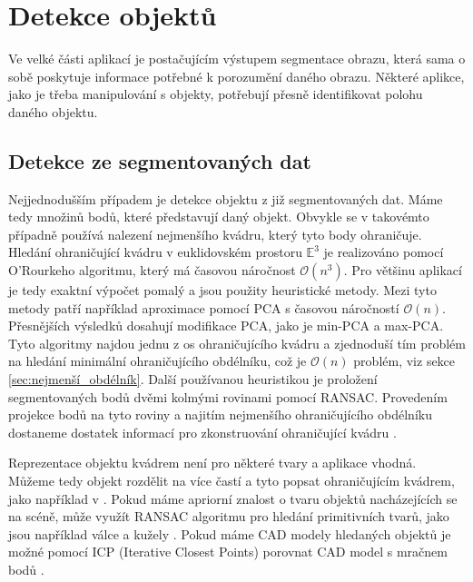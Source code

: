 \documentclass[twoside]{ctuthesis}
\begin{document}
\section{Detekce objektů}
Ve velké části aplikací je postačujícím výstupem segmentace obrazu, která sama o sobě poskytuje informace potřebné k porozumění daného obrazu. Některé aplikce, jako je třeba manipulování s objekty, potřebují přesně identifikovat polohu daného objektu. 

\subsection{Detekce ze segmentovaných dat}
Nejjednodušším případem je detekce objektu z již segmentovaných dat. Máme tedy množinů bodů, které představují daný objekt. Obvykle se v takovémto případně používá nalezení nejmenšího kvádru, který tyto body ohraničuje. Hledání ohraničující kvádru v euklidovském prostoru $\mathbb{E}^{3}$ je realizováno pomocí O’Rourkeho algoritmu, který má časovou náročnost $\mathcal{O}(n^3)$\cite{chang2011fast}. Pro většinu aplikací je tedy exaktní výpočet pomalý a jsou použity heuristické metody. Mezi tyto metody patří například aproximace pomocí PCA s časovou náročností $\mathcal{O}(n)$. Přesnějších výsledků dosahují modifikace PCA, jako je min-PCA a max-PCA. Tyto algoritmy najdou jednu z os ohraničujícího kvádru a zjednoduší tím problém na hledání minimální ohraničujícího obdélníku, což je $\mathcal{O}(n)$ problém, viz sekce \ref{sec:nejmenší_obdélník}. Další používanou heuristikou je proložení segmentovaných bodů dvěmi kolmými rovinami pomocí RANSAC. Provedením projekce bodů na tyto roviny a najitím nejmenšího ohraničujícího obdélníku dostaneme dostatek informací pro zkonstruování ohraničující kvádru \cite{jia20133d}. \cite{chang2011fast}

Reprezentace objektu kvádrem není pro některé tvary a aplikace vhodná. Můžeme tedy objekt rozdělit na více častí a tyto popsat ohraničujícím kvádrem, jako například v \cite{huebner2008minimum}. Pokud máme apriorní znalost o tvaru objektů nacházejících se na scéně, může využít RANSAC algoritmu pro hledání primitivních tvarů, jako jsou například válce a kužely \cite{garcia2009fitting}. Pokud máme CAD modely hledaných objektů je možné pomocí ICP (Iterative Closest Points) porovnat CAD model s mračnem bodů \cite{kim2014object}.
\end{document}
